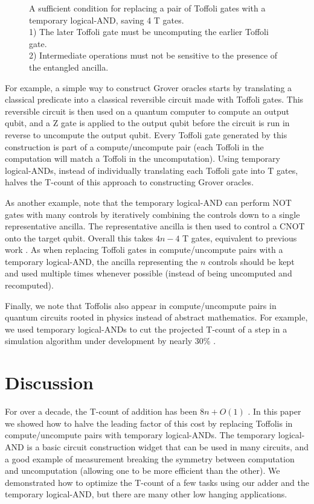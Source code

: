 \documentclass[twocolumn]{revtex4-1}
\begin{document}
\begin{figure}
  
  \caption{
	A sufficient condition for replacing a pair of Toffoli gates with a temporary logical-AND, saving 4 T gates.\\
	1) The later Toffoli gate must be uncomputing the earlier Toffoli gate.\\
	2) Intermediate operations must not be sensitive to the presence of the entangled ancilla.
  }
  \label{fig:pair-definition}
\end{figure}

For example, a simple way to construct Grover oracles starts by translating a classical predicate into a classical reversible circuit made with Toffoli gates.
This reversible circuit is then used on a quantum computer to compute an output qubit, and a Z gate is applied to the output qubit before the circuit is run in reverse to uncompute the output qubit.
Every Toffoli gate generated by this construction is part of a compute/uncompute pair (each Toffoli in the computation will match a Toffoli in the uncomputation).
Using temporary logical-ANDs, instead of individually translating each Toffoli gate into T gates, halves the T-count of this approach to constructing Grover oracles.

As another example, note that the temporary logical-AND can perform NOT gates with many controls by iteratively combining the controls down to a single representative ancilla.
The representative ancilla is then used to control a CNOT onto the target qubit.
Overall this takes $4n-4$ T gates, equivalent to previous work \cite{Jones2013}.
As when replacing Toffoli gates in compute/uncompute pairs with a temporary logical-AND, the ancilla representing the $n$ controls should be kept and used multiple times whenever possible (instead of being uncomputed and recomputed).

Finally, we note that Toffolis also appear in compute/uncompute pairs in quantum circuits rooted in physics instead of abstract mathematics.
For example, we used temporary logical-ANDs to cut the projected T-count of a step in a simulation algorithm under development by nearly 30\% \citep{RyanEmails2017}.


\section*{Discussion}

For over a decade, the T-count of addition has been $8n + O(1)$ \citep{Amy2013, Barenco1995, Cuccaro2004}.
In this paper we showed how to halve the leading factor of this cost by replacing Toffolis in compute/uncompute pairs with temporary logical-ANDs.
The temporary logical-AND is a basic circuit construction widget that can be used in many circuits, and a good example of measurement breaking the symmetry between computation and uncomputation (allowing one to be more efficient than the other).
We demonstrated how to optimize the T-count of a few tasks using our adder and the temporary logical-AND, but there are many other low hanging applications.
\end{document}
